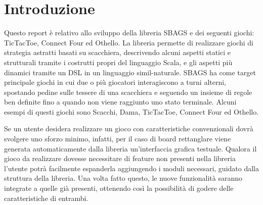 \section*{Introduzione}
Questo report è relativo allo sviluppo della libreria SBAGS e dei seguenti giochi: TicTacToe, Connect Four ed Othello.
%
La libreria permette di realizzare giochi di strategia astratti basati su scacchiera, descrivendo alcuni aspetti statici e strutturali tramite i costrutti propri del linguaggio Scala, e gli aspetti più dinamici tramite un DSL in un linguaggio simil-naturale.
%
SBAGS ha come target principale giochi in cui due o più giocatori interagiscono a turni alterni, spostando pedine sulle tessere di una scacchiera e seguendo un insieme di regole ben definite fino a quando non viene raggiunto uno stato terminale.
%
Alcuni esempi di questi giochi sono Scacchi, Dama, TicTacToe, Connect Four ed Othello.

Se un utente desidera realizzare un gioco con caratteristiche convenzionali dovrà svolgere uno sforzo minimo, infatti, per il caso di board rettanglare viene generata automaticamente dalla libreria un'interfaccia grafica testuale.
%
Qualora il gioco da realizzare dovesse necessitare di feature non presenti nella libreria l'utente potrà facilmente espanderla aggiungendo i moduli necessari, guidato dalla struttura della libreria.
%
Una volta fatto questo, le nuove funzionalità saranno integrate a quelle già presenti, ottenendo così la possibilità di godere delle caratteristiche di entrambi.

